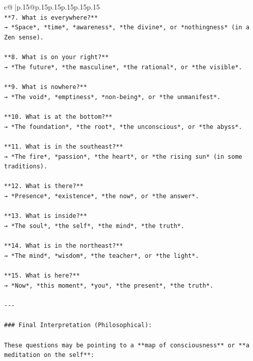 \documentclass{article}
\begin{document}
{\begin{supertabular}{c@{$\;$}|p{.15\linewidth}@{}p{.15\linewidth}p{.15\linewidth}p{.15\linewidth}p{.15\linewidth}p{.15\linewidth}}
{{{\\ 
\texttt{**7. What is everywhere?**  } \\
\texttt{→ *Space*, *time*, *awareness*, *the divine*, or *nothingness* (in a Zen sense).} \\
\\ 
\texttt{**8. What is on your right?**  } \\
\texttt{→ *The future*, *the masculine*, *the rational*, or *the visible*.} \\
\\ 
\texttt{**9. What is nowhere?**  } \\
\texttt{→ *The void*, *emptiness*, *non{-}being*, or *the unmanifest*.} \\
\\ 
\texttt{**10. What is at the bottom?**  } \\
\texttt{→ *The foundation*, *the root*, *the unconscious*, or *the abyss*.} \\
\\ 
\texttt{**11. What is in the southeast?**  } \\
\texttt{→ *The fire*, *passion*, *the heart*, or *the rising sun* (in some traditions).} \\
\\ 
\texttt{**12. What is there?**  } \\
\texttt{→ *Presence*, *existence*, *the now*, or *the answer*.} \\
\\ 
\texttt{**13. What is inside?**  } \\
\texttt{→ *The soul*, *the self*, *the mind*, *the truth*.} \\
\\ 
\texttt{**14. What is in the northeast?**  } \\
\texttt{→ *The mind*, *wisdom*, *the teacher*, or *the light*.} \\
\\ 
\texttt{**15. What is here?**  } \\
\texttt{→ *Now*, *this moment*, *you*, *the present*, *the truth*.} \\
\\ 
\texttt{{-}{-}{-}} \\
\\ 
\texttt{\#\#\# Final Interpretation (Philosophical):} \\
\\ 
\texttt{These questions may be pointing to a **map of consciousness** or **a meditation on the self**:} \\
}}}
\end{supertabular}}
\end{document}
